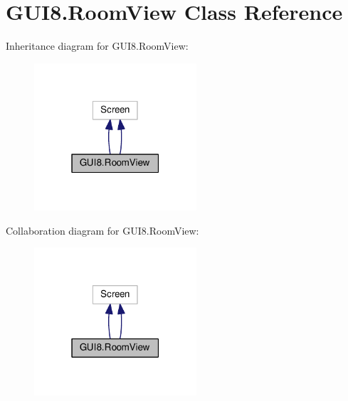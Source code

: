 \hypertarget{classGUI8_1_1RoomView}{}\section{G\+U\+I8.\+Room\+View Class Reference}
\label{classGUI8_1_1RoomView}


Inheritance diagram for G\+U\+I8.\+Room\+View\+:\nopagebreak
\begin{figure}[H]
\begin{center}
\leavevmode
\includegraphics[width=171pt]{classGUI8_1_1RoomView__inherit__graph}
\end{center}
\end{figure}


Collaboration diagram for G\+U\+I8.\+Room\+View\+:\nopagebreak
\begin{figure}[H]
\begin{center}
\leavevmode
\includegraphics[width=171pt]{classGUI8_1_1RoomView__coll__graph}
\end{center}
\end{figure}
